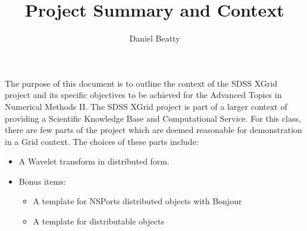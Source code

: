 \documentclass[11pt]{article}
\title{Project Summary and Context}
\author{Daniel Beatty}
\begin{document}
\maketitle
\newpage
\begin{Large}
The purpose of this document is to outline the context of the SDSS XGrid project and its specific objectives to be achieved for the Advanced Topics in Numerical Methods II.    The SDSS XGrid project is part of a %
larger context of providing a Scientific Knowledge Base and Computational Service.  %
For this class, there are few parts of the project which are deemed reasonable for demonstration in a Grid context.  The choices of these parts include:
\begin{itemize}
\item A Wavelet transform in distributed form.
\item Bonus items:
\begin {itemize}
\item A template for NSPorts distributed objects with Bonjour
\item A template for distributable objects
\end{itemize}
\end{itemize}
\end{Large}
\end{document}
